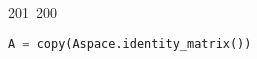 201~200~\documentclass{article}
\begin{document}
\begin{lstlisting}[language=Python, caption=Python Code for Lattice Attack Setup]
	                                                                        	                                                                    	                                	                    	                    	                        	                        	                    	                                                                	                	                                                                    	                    							                                        A = copy(Aspace.identity_matrix())

	                                                                        	                                                                    	                                	                    	                    	                        	                        	                    	                                                                	                	                                                                    	                    							                                            A = A*n
	                                                                        	                                                                    	                                	                    	                    	                        	                        	                    	                                                                	                	                                                                    	                    							                                                B = n // pow(2,32)

	                                                                        	                                                                    	                                	                    	                    	                        	                        	                    	                                                                	                	                                                                    	                    							                                                    A[ - 2,  - 2] = B / n
	                                                                        	                                                                    	                                	                    	                    	                        	                        	                    	                                                                	                	                                                                    	                    							                                                        A[ - 1,  - 1] = B


\end{lstlisting}
\end{document}
